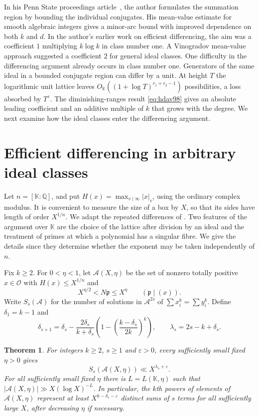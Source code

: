 \documentclass[11pt,letterpaper]{article}
\newtheorem{theorem}{Theorem}[section]
\theoremstyle{definition}
\numberwithin{equation}{section}
\begin{document}
In his Penn State proceedings article~\cite{hdavpenn}, the author
formulates the summation region by bounding the individual conjugates.
His mean-value estimate for smooth algebraic integers gives a minor-arc
bound with improved dependence on both $k$ and $d$. In the author's
earlier work on efficient differencing, the aim was a coefficient
$1$ multiplying $k\log k$ in class number one. A Vinogradov
mean-value approach suggested a coefficient $2$ for general ideal
classes. One difficulty in the differencing argument already occurs
in class number one. Generators of the same ideal in a bounded
conjugate region can differ by a unit. At height $T$ the logarithmic
unit lattice leaves $O_{\mathbb K}((1+\log T)^{r_1+r_2-1})$
possibilities, a loss absorbed by $T^\varepsilon$. The
diminishing-ranges result \eqref{eq:hdav98} gives an absolute
leading coefficient and an additive multiple of $k$ that grows
with the degree. We next examine how the ideal classes enter the
differencing argument.

\section{Efficient differencing in arbitrary ideal classes}\label{sec:ed}
Let $n=[\mathbb K:\mathbb Q]$, and put $H(x)=\max_{v\mid\infty}|x|_v$,
using the ordinary complex modulus. It is convenient to measure the size
of a box by $X$, so that its sides have length of order $X^{1/n}$.
We adapt the repeated differences of \cite{edwooley,edvw}. Two features
of the argument over $\mathbb K$ are the choice of the lattice after division
by an ideal and the treatment of primes at which a polynomial has a
singular fibre. We give the details since they determine whether the
exponent may be taken independently of $n$.

Fix $k\ge2$. For $0<\eta<1$, let $\mathcal A(X,\eta)$ be the set of
nonzero totally positive $x\in\mathcal O$ with $H(x)\le X^{1/n}$ and
\[
 X^{\eta/2}<N\mathfrak p\le X^\eta
           \qquad(\mathfrak p\mid(x)).
\]
Write $S_s(\mathcal A)$ for the number of solutions in $\mathcal A^{2s}$
of $\sum x_i^k=\sum y_i^k$. Define $\delta_1=k-1$ and
\begin{equation}\label{eq:eddefect}
 \delta_{s+1}=\delta_s-
  \frac{2\delta_s}{k+\delta_s}
  \left(1-\left(\frac{k-\delta_s}{2k}\right)^k\right),
 \qquad \lambda_s=2s-k+\delta_s .
\end{equation}

\begin{theorem}\label{thm:edmoment}
For integers $k\ge2$, $s\ge1$ and $\varepsilon>0$, every sufficiently
small fixed $\eta>0$ gives
\[
 S_s(\mathcal A(X,\eta))\ll X^{\lambda_s+\varepsilon}.
\]
For all sufficiently small fixed $\eta$ there is $L=L(\mathbb K,\eta)$
such that $|\mathcal A(X,\eta)|\gg X(\log X)^{-L}$. In particular, the
$k$th powers of elements of $\mathcal A(X,\eta)$ represent at least
$X^{k-\delta_s-\varepsilon}$ distinct sums of $s$ terms for all sufficiently
large $X$, after decreasing $\eta$ if necessary.
\end{theorem}
\end{document}
